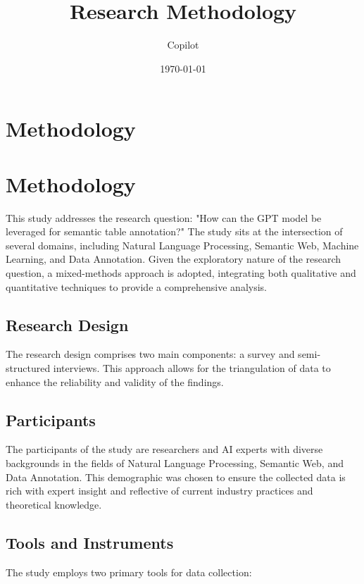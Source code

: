 \documentclass{article}
\title{Research Methodology}
\author{Copilot}
\date{\today}
\begin{document}
\maketitle

\section*{Methodology}
\section{Methodology}

This study addresses the research question: "How can the GPT model be leveraged for semantic table annotation?" The study sits at the intersection of several domains, including Natural Language Processing, Semantic Web, Machine Learning, and Data Annotation. Given the exploratory nature of the research question, a mixed-methods approach is adopted, integrating both qualitative and quantitative techniques to provide a comprehensive analysis.

\subsection{Research Design}

The research design comprises two main components: a survey and semi-structured interviews. This approach allows for the triangulation of data to enhance the reliability and validity of the findings. 

\subsection{Participants}

The participants of the study are researchers and AI experts with diverse backgrounds in the fields of Natural Language Processing, Semantic Web, and Data Annotation. This demographic was chosen to ensure the collected data is rich with expert insight and reflective of current industry practices and theoretical knowledge.

\subsection{Tools and Instruments}

The study employs two primary tools for data collection:
\end{document}
